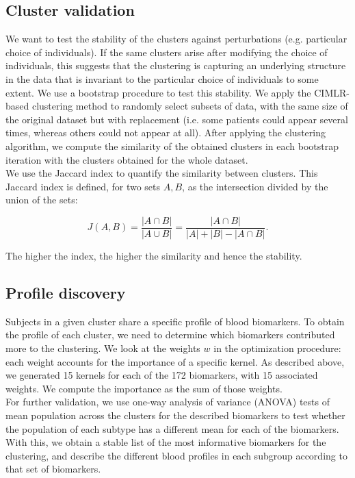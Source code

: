 \subsection{Cluster validation}

We want to test the stability of the clusters against perturbations (e.g. particular choice of individuals). If the same clusters arise after modifying the choice of individuals, this suggests that the clustering is capturing an underlying structure in the data that is invariant to the particular choice of individuals to some extent. We use a bootstrap procedure to test this stability. We apply the CIMLR-based clustering method to randomly select subsets of data, with the same size of the original dataset but with replacement (i.e. some patients could appear several times, whereas others could not appear at all). After applying the clustering algorithm, we compute the similarity of the obtained clusters in each bootstrap iteration with the clusters obtained for the whole dataset. \\

We use the Jaccard index to quantify the similarity between clusters. This Jaccard index is defined, for two sets $A,B$, as the intersection divided by the union of the sets:

\begin{equation}
J(A,B) = {\frac{|A \cap B|}{|A \cup B|}} = {\frac{|A \cap B|}{|A| + |B| - |A \cap B|}}.
\end{equation}

The higher the index, the higher the similarity and hence the stability.

\subsection{Profile discovery}

Subjects in a given cluster share a specific profile of blood biomarkers. To obtain the profile of each cluster, we need to determine which biomarkers contributed more to the clustering. We look at the weights $w$ in the optimization procedure: each weight accounts for the importance of a specific kernel. As described above, we generated 15 kernels for each of the 172 biomarkers, with 15 associated weights. We compute the importance as the sum of those weights. \\

For further validation, we use one-way analysis of variance (ANOVA) tests of mean population across the clusters for the described biomarkers to test whether the population of each subtype has a different mean for each of the biomarkers. With this, we obtain a stable list of the most informative biomarkers for the clustering, and describe the different blood profiles in each subgroup according to that set of biomarkers. \\


